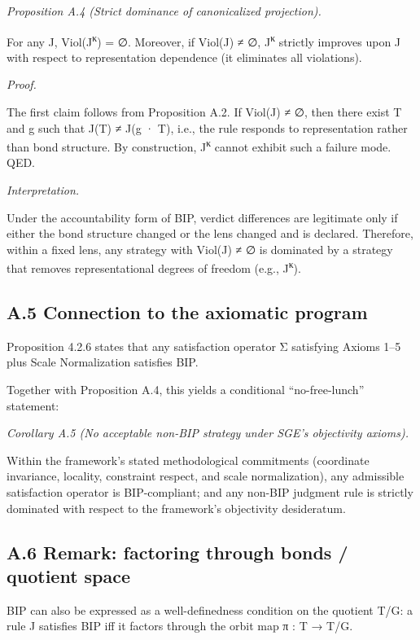 \documentclass[12pt]{article}
\theoremstyle{plain}
\theoremstyle{definition}
\theoremstyle{remark}
\begin{document}
\emph{Proposition A.4 (Strict dominance of canonicalized projection).}

For any J, Viol(J\textsuperscript{κ}) = ∅. Moreover, if Viol(J) ≠ ∅,
J\textsuperscript{κ} strictly improves upon J with respect to
representation dependence (it eliminates all violations).

\emph{Proof.}

The first claim follows from Proposition A.2. If Viol(J) ≠ ∅, then there
exist T and g such that J(T) ≠ J(g · T), i.e., the rule responds to
representation rather than bond structure. By construction,
J\textsuperscript{κ} cannot exhibit such a failure mode. QED.

\emph{Interpretation.}

Under the accountability form of BIP, verdict differences are legitimate
only if either the bond structure changed or the lens changed and is
declared. Therefore, within a fixed lens, any strategy with Viol(J) ≠ ∅
is dominated by a strategy that removes representational degrees of
freedom (e.g., J\textsuperscript{κ}).

\subsection{A.5 Connection to the axiomatic
program}\label{a.5-connection-to-the-axiomatic-program}

Proposition 4.2.6 states that any satisfaction operator Σ satisfying
Axioms 1--5 plus Scale Normalization satisfies BIP.

Together with Proposition A.4, this yields a conditional
``no-free-lunch'' statement:

\emph{Corollary A.5 (No acceptable non-BIP strategy under SGE's
objectivity axioms).}

Within the framework's stated methodological commitments (coordinate
invariance, locality, constraint respect, and scale normalization), any
admissible satisfaction operator is BIP-compliant; and any non-BIP
judgment rule is strictly dominated with respect to the framework's
objectivity desideratum.

\subsection{A.6 Remark: factoring through bonds / quotient
space}\label{a.6-remark-factoring-through-bonds-quotient-space}

BIP can also be expressed as a well-definedness condition on the
quotient T/G: a rule J satisfies BIP iff it factors through the orbit
map π : T → T/G.
\end{document}

